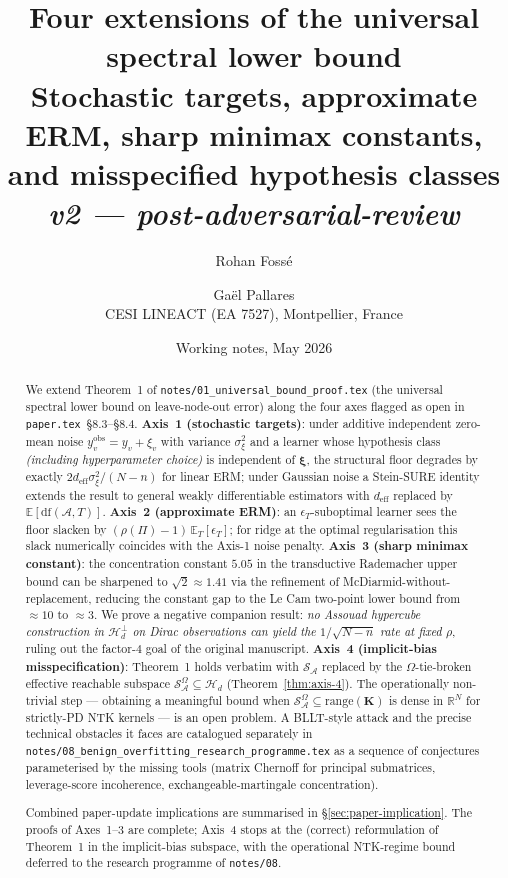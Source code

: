 \documentclass[11pt,a4paper]{article}
\title{\textbf{Four extensions of the universal spectral lower bound}\\
\large{Stochastic targets, approximate ERM, sharp minimax constants,
and misspecified hypothesis classes} \\
\large{\emph{v2 --- post-adversarial-review}}}
\author{Rohan Foss\'e \and Ga\"el Pallares\\
\small{CESI LINEACT (EA 7527), Montpellier, France}}
\date{Working notes, May 2026}
\theoremstyle{plain}
\theoremstyle{definition}
\theoremstyle{remark}
\newcommand{\bxi}{\boldsymbol{\xi}}
\newcommand{\bK}{\mathbf{K}}
\newcommand{\E}{\mathbb{E}}
\newcommand{\R}{\mathbb{R}}
\newcommand{\Scal}{\mathcal{S}}
\newcommand{\Acal}{\mathcal{A}}
\newcommand{\Hcal}{\mathcal{H}}
\newcommand{\df}{\mathrm{df}}
\begin{document}
\maketitle

\begin{abstract}
We extend Theorem~1 of \texttt{notes/01\_universal\_bound\_proof.tex}
(the universal spectral lower bound on leave-node-out error) along
the four axes flagged as open in \texttt{paper.tex}~\S8.3--\S8.4.
\textbf{Axis~1 (stochastic targets)}: under additive independent
zero-mean noise $y^{\mathrm{obs}}_v = y_v + \xi_v$ with variance
$\sigma_\xi^2$ and a learner whose hypothesis class
\emph{(including hyperparameter choice)} is independent of $\bxi$,
the structural floor degrades by exactly
$2 d_{\mathrm{eff}} \sigma_\xi^2/(N-n)$ for linear ERM; under
Gaussian noise a Stein-SURE identity extends the result to general
weakly differentiable estimators with $d_{\mathrm{eff}}$ replaced by
$\E[\df(\Acal, T)]$.
\textbf{Axis~2 (approximate ERM)}: an $\epsilon_T$-suboptimal
learner sees the floor slacken by $(\rho(\Pi)-1)\,\E_T[\epsilon_T]$;
for ridge at the optimal regularisation this slack numerically
coincides with the Axis-1 noise penalty.
\textbf{Axis~3 (sharp minimax constant)}: the
\citet{ElYanivPechyony2006} concentration constant $5.05$ in the
transductive Rademacher upper bound can be sharpened to
$\sqrt 2 \approx 1.41$ via the \citet{BardenetMaillard2015}
refinement of McDiarmid-without-replacement, reducing the constant
gap to the Le Cam two-point lower bound from $\approx 10$ to
$\approx 3$. We prove a negative companion result: \emph{no Assouad
hypercube construction in $\Hcal_d^\perp$ on Dirac observations can
yield the $1/\sqrt{N-n}$ rate at fixed $\rho$}, ruling out the
factor-$4$ goal of the original manuscript.
\textbf{Axis~4 (implicit-bias misspecification)}: Theorem~1 holds
verbatim with $\Scal_\Acal$ replaced by the $\Omega$-tie-broken
effective reachable subspace $\Scal_\Acal^\Omega \subseteq \Hcal_d$
(Theorem~\ref{thm:axis-4}). The operationally non-trivial step
--- obtaining a meaningful bound when $\Scal_\Acal^\Omega \subseteq
\mathrm{range}(\bK)$ is dense in $\R^N$ for strictly-PD NTK
kernels --- is an open problem. A BLLT-style attack and the precise
technical obstacles it faces are catalogued separately in
\texttt{notes/08\_benign\_overfitting\_research\_programme.tex} as
a sequence of conjectures parameterised by the missing tools
(matrix Chernoff for principal submatrices, leverage-score
incoherence, exchangeable-martingale concentration).

Combined paper-update implications are summarised in
\S\ref{sec:paper-implication}. The proofs of Axes~1--3 are
complete; Axis~4 stops at the (correct) reformulation of
Theorem~1 in the implicit-bias subspace, with the operational
NTK-regime bound deferred to the research programme of
\texttt{notes/08}.
\end{abstract}
\end{document}
